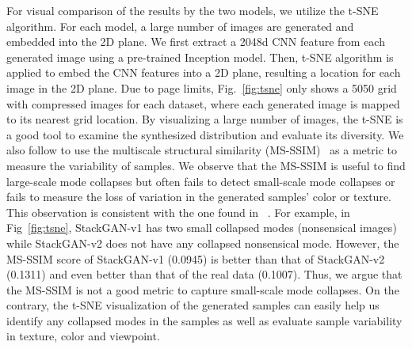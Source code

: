 \documentclass[10pt,journal,letterpaper,compsoc]{IEEEtran}
\begin{document}
{For visual comparison of the results by the two models, we utilize the t-SNE~\cite{t-SNE} algorithm. For each model, a large number of images are generated and embedded into the 2D plane. We first extract a 2048d CNN feature from each generated image using a pre-trained Inception model. Then, t-SNE algorithm is applied to embed the CNN features into a 2D plane, resulting a location for each image in the 2D plane. Due to page limits, Fig.~\ref{fig:tsne} only shows a 5050 grid with compressed images for each dataset, where each generated image is mapped to its nearest grid location. By visualizing a large number of images, the t-SNE is a good tool to examine the synthesized distribution and evaluate its diversity. We also follow \cite{Odena2016} to use the multiscale structural similarity (MS-SSIM)~\cite{WangSB03} as a metric to measure the variability of samples. We observe that the MS-SSIM is useful to find large-scale mode collapses but often fails to detect small-scale mode collapses or fails to measure the loss of variation in the generated samples' color or texture. This observation is consistent with the one found in ~\cite{KarrasALL18}. For example, in Fig~\ref{fig:tsne}, StackGAN-v1 has two small collapsed modes (nonsensical images) while StackGAN-v2 does not have any collapsed nonsensical mode.  However, the MS-SSIM score of StackGAN-v1 (0.0945) is better than that of StackGAN-v2 (0.1311) and even better than that of the real data (0.1007). Thus, we argue that the MS-SSIM is not a good metric to capture small-scale mode collapses. On the contrary, the t-SNE visualization of the generated samples can easily help us identify any collapsed modes in the samples as well as evaluate sample variability in texture, color and viewpoint. 


}
\end{document}
